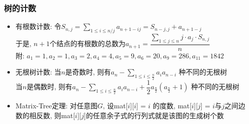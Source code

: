 \documentclass[landscape,a4paper]{article}
\begin{document}
\begin{spacing}{0.3}
\begin{multicols}{2}
\subsubsection{树的计数}
\begin{itemize}
\item 有根数计数: 令$S_{n, j} = \sum\limits_{1 \le i \le n / j} a_{n + 1 - ij} = S_{n - j, j} + a_{n + 1 - j}$\\
  于是, $n + 1$个结点的有根数的总数为$a_{n + 1} = \dfrac{\sum\limits_{1 \le j \le n} j \cdot a_j \cdot S_{n, j} }{n}$\\
  附: $a_1 = 1, a_2 = 1, a_3 = 2, a_4 = 4, a_5 = 9, a_6 = 20, a_9 = 286, a_{11} = 1842$
\item 无根树计数: 当$n$是奇数时, 则有$a_n - \sum\limits_{1 \le i \le \frac{n}{2}} a_i a_{n - i}$ 种不同的无根树\\
  当$n$是偶数时, 则有$a_n - \sum\limits_{1 \le i \le \frac{n}{2}} a_i a_{n - i} + \dfrac{1}{2} a_\frac{n}{2} (a_\frac{n}{2} + 1)$ 种不同的无根树
\item Matrix-Tree定理: 对任意图$G$, 设mat[$i$][$i$] = $i$ 的度数, mat[$i$][$j$] = $i$与$j$之间边数的相反数, 则mat[$i$][$j$]的任意余子式的行列式就是该图的生成树个数
\end{itemize}


\end{multicols}
\end{spacing}
\end{document}
